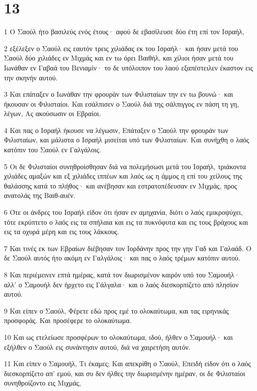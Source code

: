 \chapter{13}

\par 1 Ο Σαούλ ήτο βασιλεύς ενός έτους· αφού δε εβασίλευσε δύο έτη επί τον Ισραήλ,
\par 2 εξέλεξεν ο Σαούλ εις εαυτόν τρεις χιλιάδας εκ του Ισραήλ· και ήσαν μετά του Σαούλ δύο χιλιάδες εν Μιχμάς και εν τω όρει Βαιθήλ, και χίλιοι ήσαν μετά του Ιωνάθαν εν Γαβαά του Βενιαμίν· το δε υπόλοιπον του λαού εξαπέστειλεν έκαστον εις την σκηνήν αυτού.
\par 3 Και επάταξεν ο Ιωνάθαν την φρουράν των Φιλισταίων την εν τω βουνώ· και ήκουσαν οι Φιλισταίοι. Και εσάλπισεν ο Σαούλ διά της σάλπιγγος εν πάση τη γη, λέγων, Ας ακούσωσιν οι Εβραίοι.
\par 4 Και πας ο Ισραήλ ήκουσε να λέγωσιν, Επάταξεν ο Σαούλ την φρουράν των Φιλισταίων, και μάλιστα ο Ισραήλ μισείται υπό των Φιλισταίων. Και συνήχθη ο λαός κατόπιν του Σαούλ εν Γαλγάλοις.
\par 5 Οι δε Φιλισταίοι συνηθροίσθησαν διά να πολεμήσωσι μετά του Ισραήλ, τριάκοντα χιλιάδες αμαξών και εξ χιλιάδες ιππέων και λαός ως η άμμος η επί του χείλους της θαλάσσης κατά το πλήθος· και ανέβησαν και εστρατοπέδευσαν εν Μιχμάς, προς ανατολάς της Βαιθ-αυέν.
\par 6 Ότε οι άνδρες του Ισραήλ είδον ότι ήσαν εν αμηχανία, διότι ο λαός εμικροψύχει, τότε εκρύπτετο ο λαός εις τα σπήλαια και εις τα πυκνόφυτα και εις τους βράχους και εις τα οχυρά μέρη και εις τους λάκκους.
\par 7 Και τινές εκ των Εβραίων διέβησαν τον Ιορδάνην προς την γην Γαδ και Γαλαάδ. Ο δε Σαούλ αυτός ήτο ακόμη εν Γαλγάλοις· και πας ο λαός τρέμων κατόπιν αυτού.
\par 8 Και περιέμεινεν επτά ημέρας, κατά τον διωρισμένον καιρόν υπό του Σαμουήλ· αλλ' ο Σαμουήλ δεν ήρχετο εις Γάλγαλα· και ο λαός διεσκορπίζετο από πλησίον αυτού.
\par 9 Και είπεν ο Σαούλ, Φέρετε εδώ προς εμέ το ολοκαύτωμα, και τας ειρηνικάς προσφοράς. Και προσέφερε το ολοκαύτωμα.
\par 10 Και ως ετελείωσε προσφέρων το ολοκαύτωμα, ιδού, ήλθεν ο Σαμουήλ· και εξήλθεν ο Σαούλ εις συνάντησιν αυτού, διά να χαιρετήση αυτόν.
\par 11 Και είπεν ο Σαμουήλ, Τι έκαμες; Και απεκρίθη ο Σαούλ, Επειδή είδον ότι ο λαός διεσκορπίζετο απ' εμού, και συ δεν ήλθες την διωρισμένην ημέραν, οι δε Φιλισταίοι συνηθροίζοντο εις Μιχμάς,
